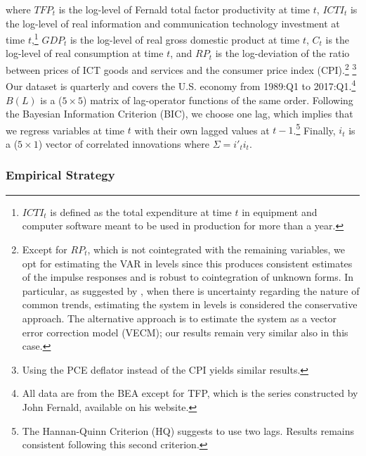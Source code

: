 \documentclass[12pt]{article}
\begin{document}
where $TFP_t$ is the log-level of Fernald total factor productivity at time $t$, $ICTI_{t}$ is the log-level of real information and communication technology investment at time $t$,\footnote{$ICTI_t$ is defined as the total expenditure at time $t$ in equipment and computer software meant to be used in production for more than a year.} $GDP_t$ is the log-level of real gross domestic product at time $t$, $C_t$ is the log-level of real consumption at time $t$, and $RP_t$ is the log-deviation of the ratio between prices of ICT goods and services and the consumer price index (CPI).\footnote{Except for $RP_t$, which is not cointegrated with the remaining variables, we opt for estimating the VAR in levels since this produces consistent estimates of the impulse responses and is robust to cointegration of unknown forms. In particular, as suggested by \cite{hamilton1994time}, when there is uncertainty regarding the nature of common trends, estimating the system in levels is considered the conservative approach. The alternative approach is to estimate the system as a vector error correction model (VECM); our results remain very similar also in this case.} \footnote{Using the PCE deflator instead of the CPI yields similar results.} Our dataset is quarterly and covers the U.S. economy from 1989:Q1 to 2017:Q1.\footnote{All data are from the BEA except for TFP, which is the series constructed by John Fernald, available on his website.} $B(L)$ is a ($5\times 5$) matrix of lag-operator functions of the same order. Following the Bayesian Information Criterion (BIC), we choose one lag, which implies that we regress variables at time $t$ with their own lagged values at $t-1$.\footnote{The Hannan-Quinn Criterion (HQ) suggests to use two lags. Results remains consistent following this second criterion.} Finally, $i_t$ is a ($5 \times 1$) vector of correlated innovations where $\Sigma = i'_t i_t$.

\subsubsection{Empirical Strategy}\label{section:empiricalstrategy_simple}
\end{document}
